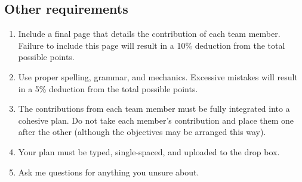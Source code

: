 \documentclass[12pt, hidelinks, addpoints]{exam}
\begin{document}
\subsection*{Other requirements}

\begin{enumerate}[label=\textsc{\alph*}.]

	\item Include a final page that details the contribution of each team member. Failure to include this page will result in a 10\% deduction from the total possible points.

	\item Use proper spelling, grammar, and mechanics. Excessive mistakes will result in a 5\% deduction from the total possible points.
	
	\item The contributions from each team member must be fully integrated into a cohesive plan. Do not take each member's contribution and place them one after the other (although the objectives may be arranged this way). 
	
	\item Your plan must be typed, single-spaced, and uploaded to the drop box.
	
	\item Ask me questions for anything you unsure about.
	
\end{enumerate}
\end{document}
